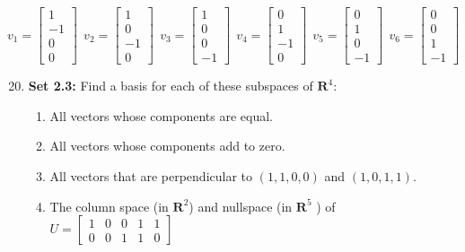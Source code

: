 \documentclass[a4paper,10pt]{article}
\begin{document}
\begin{equation*}
 v_1 = 
 \begin{bmatrix}
  1 \\ -1\\ 0 \\0
 \end{bmatrix} \:\:
  v_2 = 
 \begin{bmatrix}
  1 \\ 0\\ -1 \\0
 \end{bmatrix} \:\:
  v_3 = 
 \begin{bmatrix}
  1 \\ 0\\ 0 \\-1
 \end{bmatrix} \:\:
  v_4 = 
 \begin{bmatrix}
  0 \\ 1\\ -1 \\0
 \end{bmatrix} \:\:
  v_5 = 
 \begin{bmatrix}
  0 \\ 1\\ 0 \\-1
 \end{bmatrix} \:\:
   v_6 = 
 \begin{bmatrix}
  0 \\ 0\\ 1 \\-1
 \end{bmatrix} \:\:
\end{equation*}

\begin{enumerate}
\setcounter{enumi}{19}
\item \textbf{Set 2.3:} Find a basis for each of these subspaces of $\textbf{R}^4$:
\begin{enumerate}
 \item All vectors whose components are equal.
 \item All vectors whose components add to zero.
 \item All vectors that are perpendicular to $(1, 1, 0, 0)$ and $(1, 0, 1, 1)$.
 \item The column space (in $\textbf{R}^2$) and nullspace (in $\textbf{R}^5$ ) of $U = \begin{bmatrix}
1 & 0 & 0 & 1 & 1 \\ 
0 & 0 & 1 & 1 & 0                                                                                       \end{bmatrix}$
\end{enumerate}
\end{enumerate}
\end{document}
